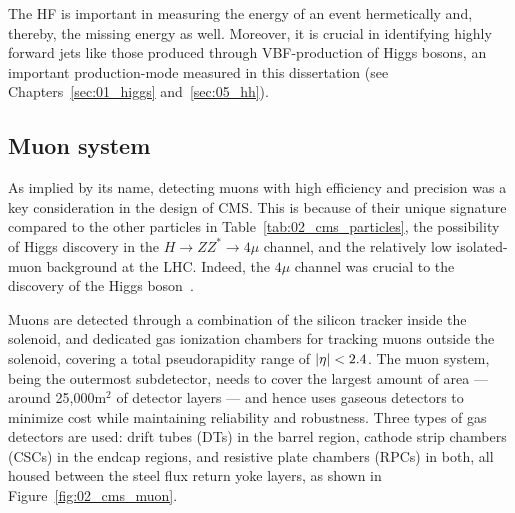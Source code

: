The HF is important in measuring the energy of an event hermetically and, thereby, the missing energy as well.
Moreover, it is crucial in identifying highly forward jets like those produced through VBF-production of Higgs bosons, an important production-mode measured in this dissertation (see Chapters~\ref{sec:01_higgs} and~\ref{sec:05_hh}).


\subsection{Muon system}

As implied by its name, detecting muons with high efficiency and precision was a key consideration in the design of CMS.
This is because of their unique signature compared to the other particles in Table~\ref{tab:02_cms_particles}, the possibility of Higgs discovery in the $H\to ZZ^*\to 4\mu$ channel, and the relatively low isolated-muon background at the LHC.
Indeed, the $4\mu$ channel was crucial to the discovery of the Higgs boson~\cite{CMS:2012qbp}.

Muons are detected through a combination of the silicon tracker inside the solenoid, and dedicated gas ionization chambers for tracking muons outside the solenoid, covering a total pseudorapidity range of $\left\lvert \eta \right\rvert < 2.4$.
The muon system, being the outermost subdetector, needs to cover the largest amount of area --- around 25,000m$^2$ of detector layers --- and hence uses gaseous detectors to minimize cost while maintaining reliability and robustness.
Three types of gas detectors are used: drift tubes (DTs) in the barrel region, cathode strip chambers (CSCs) in the endcap regions, and resistive plate chambers (RPCs) in both, all housed between the steel flux return yoke layers, as shown in Figure~\ref{fig:02_cms_muon}.

